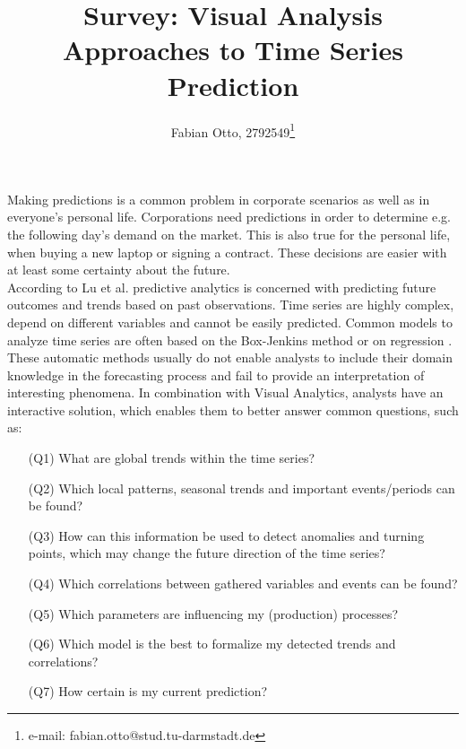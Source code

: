 \documentclass[electronic]{vgtc}             %
\title{Survey: Visual Analysis Approaches to Time Series Prediction}
\author{Fabian Otto, 2792549\thanks{e-mail: fabian.otto@stud.tu-darmstadt.de}}
\affiliation{\scriptsize Technische Universit\"at Darmstadt}
\begin{document}

\maketitle

Making predictions is a common problem in corporate scenarios as well as in everyone's personal life. 
Corporations need predictions in order to determine e.g. the following day's demand on the market.
This is also true for the personal life, when buying a new laptop or signing a contract.
These decisions are easier with at least some certainty about the future.\\
According to Lu et al. \cite{Lu:2017} predictive analytics is concerned with predicting future outcomes and trends based on past observations.
Time series are highly complex, depend on different variables and cannot be easily predicted. 
Common models to analyze time series are often based on the Box-Jenkins method \cite{box:2015} or on regression \cite{draper:2014}.
These automatic methods usually do not enable analysts to include their domain knowledge in the forecasting process and fail to provide an interpretation of interesting phenomena.
In combination with Visual Analytics, analysts have an interactive solution, which enables them to better answer common questions, such as: 
\begin{enumerate}
	\itemsep0em 
	\item[(Q1)] What are global trends within the time series?
	\item[(Q2)] Which local patterns, seasonal trends and important events/periods can be found?
	\item[(Q3)] How can this information be used to detect anomalies and turning points, which may change the future direction of the time series?
	\item[(Q4)] Which correlations between gathered variables and events can be found?
	\item[(Q5)] Which parameters are influencing my (production) processes?
	\item[(Q6)] Which model is the best to formalize my detected trends and correlations?
	\item[(Q7)] How certain is my current prediction? 
\end{enumerate}
\end{document}
